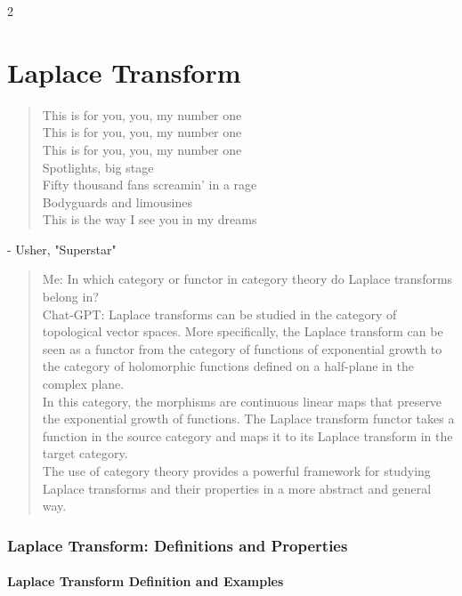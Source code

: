 \documentclass[10pt]{amsart}
\begin{document}
\begin{multicols*}{2}
\part{Laplace Transform}

\begin{quotation}
This is for you, you, my number one \\
This is for you, you, my number one \\

This is for you, you, my number one \\

Spotlights, big stage \\
Fifty thousand fans screamin' in a rage \\
Bodyguards and limousines \\
This is the way I see you in my dreams \\
\end{quotation}
- Usher, "Superstar" \\

\begin{quotation}
Me: In which category or functor in category theory do Laplace transforms belong in? \\

Chat-GPT: Laplace transforms can be studied in the category of topological vector spaces. More specifically, the Laplace transform can be seen as a functor from the category of functions of exponential growth to the category of holomorphic functions defined on a half-plane in the complex plane. \\

In this category, the morphisms are continuous linear maps that preserve the exponential growth of functions. The Laplace transform functor takes a function in the source category and maps it to its Laplace transform in the target category. \\

The use of category theory provides a powerful framework for studying Laplace transforms and their properties in a more abstract and general way.
\end{quotation}

\section{Laplace Transform: Definitions and Properties}

\subsection{Laplace Transform Definition and Examples}


\end{multicols*}
\end{document}
